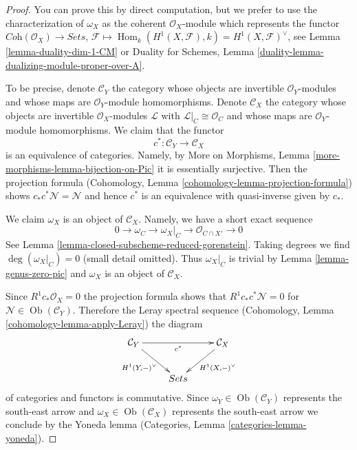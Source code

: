 \documentclass{stacks-project}
\theoremstyle{plain}
\theoremstyle{definition}
\theoremstyle{remark}
\numberwithin{equation}{subsection}
\def\Hom{\mathop{\mathrm{Hom}}\nolimits}
\def\Ob{\mathop{\mathrm{Ob}}\nolimits}
\begin{document}
\begin{proof}
You can prove this by direct computation, but we prefer to use the
characterization of $\omega_X$ as the coherent $\mathcal{O}_X$-module
which represents the functor
$\textit{Coh}(\mathcal{O}_X) \to \textit{Sets}$,
$\mathcal{F} \mapsto \Hom_k(H^1(X, \mathcal{F}), k) =
H^1(X, \mathcal{F})^\vee$, see
Lemma \ref{lemma-duality-dim-1-CM} or
Duality for Schemes, Lemma
\ref{duality-lemma-dualizing-module-proper-over-A}.

\medskip\noindent
To be precise, denote $\mathcal{C}_Y$ the category whose objects are
invertible $\mathcal{O}_Y$-modules and whose maps are
$\mathcal{O}_Y$-module homomorphisms. Denote $\mathcal{C}_X$ the category
whose objects are invertible $\mathcal{O}_X$-modules $\mathcal{L}$ with
$\mathcal{L}|_C \cong \mathcal{O}_C$ and whose maps are
$\mathcal{O}_Y$-module homomorphisms. We claim that the functor
$$
c^* : \mathcal{C}_Y \to \mathcal{C}_X
$$
is an equivalence of categories. Namely, by
More on Morphisms, Lemma \ref{more-morphisms-lemma-bijection-on-Pic}
it is essentially surjective. Then the projection formula
(Cohomology, Lemma \ref{cohomology-lemma-projection-formula})
shows $c_*c^*\mathcal{N} = \mathcal{N}$ and hence $c^*$
is an equivalence with quasi-inverse given by $c_*$.

\medskip\noindent
We claim $\omega_X$ is an object of $\mathcal{C}_X$. Namely, we have a
short exact sequence
$$
0 \to \omega_C \to \omega_X|_C \to \mathcal{O}_{C \cap X'} \to 0
$$
See Lemma \ref{lemma-closed-subscheme-reduced-gorenstein}.
Taking degrees we find $\deg(\omega_X|_C) = 0$ (small detail omitted).
Thus $\omega_X|_C$ is trivial by Lemma \ref{lemma-genus-zero-pic}
and $\omega_X$ is an object of $\mathcal{C}_X$.

\medskip\noindent
Since $R^1c_*\mathcal{O}_X = 0$ the projection formula shows that
$R^1c_*c^*\mathcal{N} = 0$ for $\mathcal{N} \in \Ob(\mathcal{C}_Y)$.
Therefore the Leray spectral sequence
(Cohomology, Lemma \ref{cohomology-lemma-apply-Leray})
the diagram
$$
\xymatrix{
\mathcal{C}_Y \ar[rr]_{c^*} \ar[dr]_{H^1(Y, -)^\vee} & &
\mathcal{C}_X \ar[ld]^{H^1(X, -)^\vee} \\
& \textit{Sets}
}
$$
of categories and functors is commutative. Since
$\omega_Y \in \Ob(\mathcal{C}_Y)$ represents the south-east arrow and
$\omega_X \in \Ob(\mathcal{C}_X)$ represents the south-east arrow
we conclude by the Yoneda lemma
(Categories, Lemma \ref{categories-lemma-yoneda}).
\end{proof}
\end{document}
